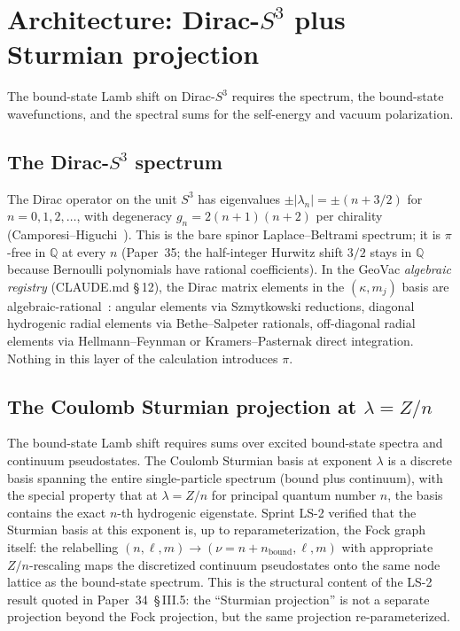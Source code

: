 \documentclass[11pt]{article}
\begin{document}
\section{Architecture: Dirac-$S^3$ plus Sturmian projection}
\label{sec:architecture}

The bound-state Lamb shift on Dirac-$S^3$ requires the spectrum, the
bound-state wavefunctions, and the spectral sums for the
self-energy and vacuum polarization.

\subsection{The Dirac-$S^3$ spectrum}

The Dirac operator on the unit $S^3$ has eigenvalues
$\pm |\lambda_n| = \pm(n + 3/2)$ for $n = 0, 1, 2, \ldots$, with
degeneracy $g_n = 2(n+1)(n+2)$ per chirality
(Camporesi--Higuchi~\cite{camporesi_higuchi}).  This is the bare
spinor Laplace--Beltrami spectrum; it is $\pi$-free in
$\mathbb{Q}$ at every $n$ (Paper~35; the
half-integer Hurwitz shift $3/2$ stays in $\mathbb{Q}$ because
Bernoulli polynomials have rational coefficients).  In the GeoVac
\emph{algebraic registry} (CLAUDE.md \S\,12), the Dirac matrix
elements in the $(\kappa, m_j)$ basis are
algebraic-rational~\cite{paper14}: angular elements via
Szmytkowski reductions, diagonal hydrogenic radial elements via
Bethe--Salpeter rationals, off-diagonal radial elements via
Hellmann--Feynman or Kramers--Pasternak direct integration.  Nothing
in this layer of the calculation introduces $\pi$.

\subsection{The Coulomb Sturmian projection at $\lambda = Z/n$}

The bound-state Lamb shift requires sums over excited bound-state
spectra and continuum pseudostates.  The Coulomb Sturmian basis at
exponent $\lambda$ is a discrete basis spanning the entire
single-particle spectrum (bound plus continuum), with the special
property that at $\lambda = Z/n$ for principal quantum number $n$,
the basis contains the exact $n$-th hydrogenic eigenstate.  Sprint
LS-2 verified that the Sturmian basis at this exponent is, up to
reparameterization, the Fock graph itself: the relabelling
$(n, \ell, m) \to (\nu = n + n_\text{bound}, \ell, m)$ with appropriate
$Z/n$-rescaling maps the discretized continuum pseudostates onto the
same node lattice as the bound-state spectrum.  This is the structural
content of the LS-2 result quoted in Paper~34~\S\,III.5: the
``Sturmian projection'' is not a separate projection beyond the Fock
projection, but the same projection re-parameterized.
\end{document}
